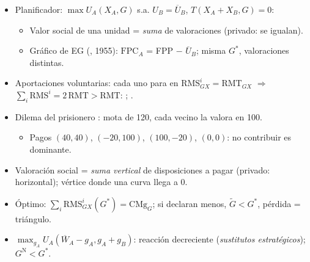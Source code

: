 \documentclass{article}
\begin{document}
\begin{columnas}
\begin{itemize}
\end{itemize}
\begin{itemize}
\item Planificador: $\max U_A(X_A,G)$ s.a. $U_B=\overline{U}_B$, $T(X_A+X_B,G)=0$:
  \begin{itemize}
  \item Valor social de una unidad = \emph{suma} de valoraciones (privado: se igualan).
  \item Gráfico de EG (, 1955): $\mathrm{FPC}_A$ = FPP $-$ $\overline{U}_B$; misma $G^*$, valoraciones distintas.
  \end{itemize}
\end{itemize}
\begin{itemize}
\item Aportaciones voluntarias: cada uno para en $\mathrm{RMS}^i_{GX}=\mathrm{RMT}_{GX}$ $\Rightarrow$ $\sum_i\mathrm{RMS}^i=2\,\mathrm{RMT}>\mathrm{RMT}$: ; .
\item Dilema del prisionero : mota de 120, cada vecino la valora en 100.
  \begin{itemize}
  \item Pagos $(40,40)$, $({-20},100)$, $(100,{-20})$, $(0,0)$: no contribuir es dominante.
  \end{itemize}
\end{itemize}
\begin{itemize}
\item Valoración social = \emph{suma vertical} de disposiciones a pagar (privado: horizontal); vértice donde una curva llega a 0.
\item Óptimo: $\sum_i\mathrm{RMS}^i_{GX}(G^*)=\mathrm{CMg}_G$; si declaran menos, $\tilde{G}<G^*$, pérdida = triángulo.
\end{itemize}
\begin{itemize}
\item $\max_{g_A}U_A(\overline{W}_A-g_A,g_A+g_B)$: reacción decreciente (\emph{sustitutos estratégicos}); $G^{\mathrm N}<G^*$.
  \begin{itemize}

\end{itemize}
\end{itemize}
\end{columnas}
\end{document}
